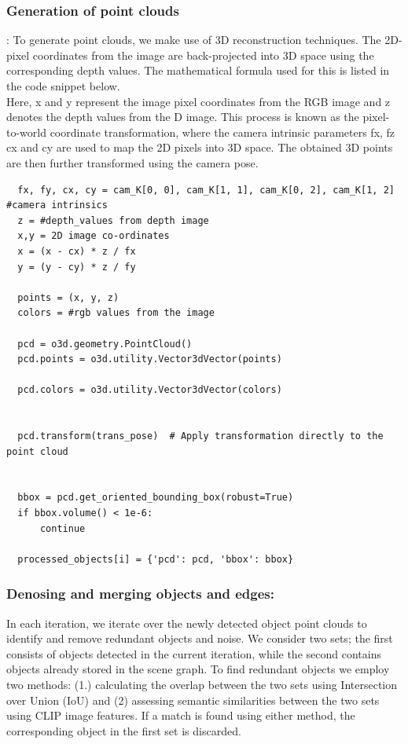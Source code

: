 \subsubsection{Generation of point clouds}:
To generate point clouds, we make use of 3D reconstruction techniques. The 2D-pixel coordinates from the image are back-projected into 3D space using the corresponding 
depth values. The mathematical formula used for this is listed  in the code snippet below. \\
Here, x and y represent the image pixel coordinates from the RGB image and z denotes the depth values from the D image. This process is known as 
the pixel-to-world coordinate transformation, where the camera intrinsic parameters fx, fz cx and cy are used to map the 2D pixels into 3D space. 
The obtained 3D points are then further transformed using the camera pose. 
\begin{lstlisting}
  fx, fy, cx, cy = cam_K[0, 0], cam_K[1, 1], cam_K[0, 2], cam_K[1, 2] #camera intrinsics
  z = #depth_values from depth image
  x,y = 2D image co-ordinates
  x = (x - cx) * z / fx
  y = (y - cy) * z / fy

  points = (x, y, z)
  colors = #rgb values from the image

  pcd = o3d.geometry.PointCloud()
  pcd.points = o3d.utility.Vector3dVector(points)

  pcd.colors = o3d.utility.Vector3dVector(colors)


  pcd.transform(trans_pose)  # Apply transformation directly to the point cloud
      

  bbox = pcd.get_oriented_bounding_box(robust=True)
  if bbox.volume() < 1e-6:
      continue

  processed_objects[i] = {'pcd': pcd, 'bbox': bbox}
\end{lstlisting}
\subsubsection{Denosing and merging objects and edges:}
In each iteration, we iterate over the newly detected object point clouds to identify and remove redundant objects and noise. We consider two sets;
the first consists of objects detected in the current iteration, while the second contains objects already stored in the scene graph. To find redundant objects 
we employ two methods: (1.) calculating the overlap between the two sets using Intersection over Union (IoU) and (2) assessing semantic similarities between the two sets using CLIP image 
features. If a match is found using either method, the corresponding object in the first set is discarded.

